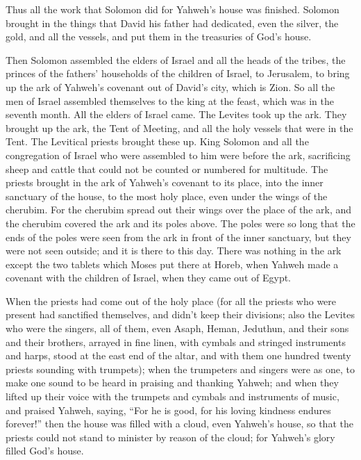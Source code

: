  Thus all the work that Solomon did for Yahweh's house was
finished. Solomon brought in the things that David his father had
dedicated, even the silver, the gold, and all the vessels, and put them
in the treasuries of God's house.

 Then Solomon assembled the elders of Israel and all the
heads of the tribes, the princes of the fathers' households of the
children of Israel, to Jerusalem, to bring up the ark of Yahweh's
covenant out of David's city, which is Zion.  So all the
men of Israel assembled themselves to the king at the feast, which was
in the seventh month.  All the elders of Israel came. The
Levites took up the ark.  They brought up the ark, the
Tent of Meeting, and all the holy vessels that were in the Tent. The
Levitical priests brought these up.  King Solomon and all
the congregation of Israel who were assembled to him were before the
ark, sacrificing sheep and cattle that could not be counted or numbered
for multitude.  The priests brought in the ark of Yahweh's
covenant to its place, into the inner sanctuary of the house, to the
most holy place, even under the wings of the cherubim. 
For the cherubim spread out their wings over the place of the ark, and
the cherubim covered the ark and its poles above.  The
poles were so long that the ends of the poles were seen from the ark in
front of the inner sanctuary, but they were not seen outside; and it is
there to this day.  There was nothing in the ark except
the two tablets which Moses put there at Horeb, when Yahweh made a
covenant with the children of Israel, when they came out of Egypt.

 When the priests had come out of the holy place (for all
the priests who were present had sanctified themselves, and didn't keep
their divisions;  also the Levites who were the singers,
all of them, even Asaph, Heman, Jeduthun, and their sons and their
brothers, arrayed in fine linen, with cymbals and stringed instruments
and harps, stood at the east end of the altar, and with them one hundred
twenty priests sounding with trumpets);  when the
trumpeters and singers were as one, to make one sound to be heard in
praising and thanking Yahweh; and when they lifted up their voice with
the trumpets and cymbals and instruments of music, and praised Yahweh,
saying, ``For he is good, for his loving kindness endures forever!''
then the house was filled with a cloud, even Yahweh's house,
 so that the priests could not stand to minister by
reason of the cloud; for Yahweh's glory filled God's house.


